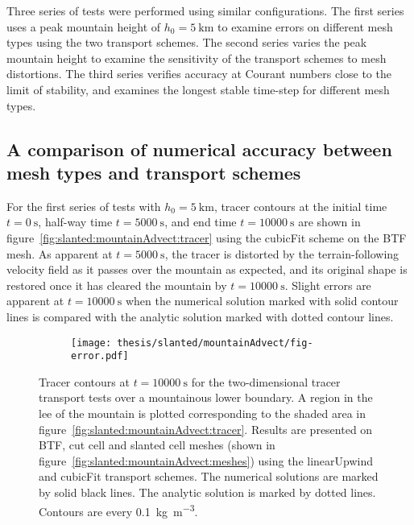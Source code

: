 Three series of tests were performed using similar configurations.  The first series uses a peak mountain height of $h_0 = \SI{5}{\kilo\meter}$ to examine errors on different mesh types using the two transport schemes.
The second series varies the peak mountain height to examine the sensitivity of the transport schemes to mesh distortions.
The third series verifies accuracy at Courant numbers close to the limit of stability, and examines the longest stable time-step for different mesh types.

\subsection{A comparison of numerical accuracy between mesh types and transport schemes}
For the first series of tests with $h_0 = \SI{5}{\kilo\meter}$, tracer contours at the initial time $t=\SI{0}{\second}$, half-way time $t=\SI{5000}{\second}$, and end time $t=\SI{10000}{\second}$ are shown in figure~\ref{fig:slanted:mountainAdvect:tracer} using the cubicFit scheme on the BTF mesh.  As apparent at $t=\SI{5000}{\second}$, the tracer is distorted by the terrain-following velocity field as it passes over the mountain as expected, and its original shape is restored once it has cleared the mountain by $t=\SI{10000}{\second}$.
Slight errors are apparent at $t = \SI{10000}{\second}$ when the numerical solution marked with solid contour lines is compared with the analytic solution marked with dotted contour lines.

\begin{figure}
	\begin{subfigure}{\textwidth}
		\centering
		\label{fig:slanted:mountainAdvect:errors:linearUpwind-btf}
		\label{fig:slanted:mountainAdvect:errors:linearUpwind-cutCell}
		\label{fig:slanted:mountainAdvect:errors:linearUpwind-slantedCell}
		\label{fig:slanted:mountainAdvect:errors:cubicFit-btf}
		\label{fig:slanted:mountainAdvect:errors:cubicFit-cutCell}
		\label{fig:slanted:mountainAdvect:errors:cubicFit-slantedCell}
		\texttt{[image: thesis/slanted/mountainAdvect/fig-error.pdf]}
	\end{subfigure}

	\caption{Tracer contours at $t=\SI{10000}{\second}$ for the two-dimensional tracer transport tests over a mountainous lower boundary.  A region in the lee of the mountain is plotted corresponding to the shaded area in figure~\ref{fig:slanted:mountainAdvect:tracer}.
	Results are presented on BTF, cut cell and slanted cell meshes (shown in figure~\ref{fig:slanted:mountainAdvect:meshes}) using the linearUpwind and cubicFit transport schemes.  The numerical solutions are marked by solid black lines.  The analytic solution is marked by dotted lines.  Contours are every \SI{0.1}{\kilo\gram\per\meter\cubed}.}
	\label{fig:slanted:mountainAdvect:errors}
\end{figure}

